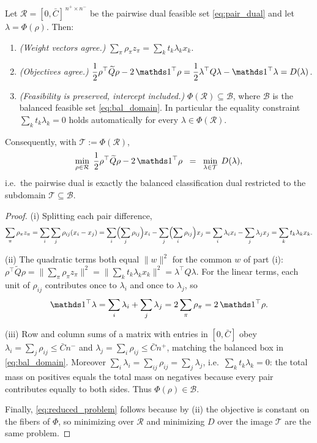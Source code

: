 \begin{theorem}
\label{thm:equivalence}
Let $\mathcal{R} = [0, \bar{C}]^{\,n^+ \times n^-}$ be the pairwise dual
feasible set \eqref{eq:pair_dual} and let $\lambda = \Phi(\rho)$. Then:
\begin{enumerate}
\item[(i)] \emph{(Weight vectors agree.)}
$\displaystyle \sum_\pi \rho_\pi z_\pi = \sum_k t_k \lambda_k x_k$.
\item[(ii)] \emph{(Objectives agree.)}
$\displaystyle \frac{1}{2}\rho^\top \widetilde{Q} \rho - 2\,\mathbbm{1}^\top\rho
= \frac{1}{2}\lambda^\top Q \lambda - \mathbbm{1}^\top\lambda = D(\lambda)$.
\item[(iii)] \emph{(Feasibility is preserved, intercept included.)}
$\Phi(\mathcal{R}) \subseteq \mathcal{B}$, where $\mathcal{B}$ is the
balanced feasible set \eqref{eq:bal_domain}. In particular the equality
constraint $\sum_k t_k \lambda_k = 0$ holds automatically for every
$\lambda \in \Phi(\mathcal{R})$.
\end{enumerate}
Consequently, with $\mathcal{T} := \Phi(\mathcal{R})$,
\begin{equation}
\min_{\rho \in \mathcal{R}}\;
\frac{1}{2}\rho^\top \widetilde{Q} \rho - 2\,\mathbbm{1}^\top\rho
\;\;=\;\;
\min_{\lambda \in \mathcal{T}}\; D(\lambda),
\label{eq:reduced_problem}
\end{equation}
i.e.\ the pairwise dual is exactly the balanced classification dual restricted
to the subdomain $\mathcal{T} \subseteq \mathcal{B}$.
\end{theorem}

\begin{proof}
(i) Splitting each pair difference,
\[
\sum_\pi \rho_\pi z_\pi
= \sum_{i}\sum_{j} \rho_{ij}(x_i - x_j)
= \sum_i \Bigl(\sum_j \rho_{ij}\Bigr) x_i - \sum_j \Bigl(\sum_i \rho_{ij}\Bigr) x_j
= \sum_i \lambda_i x_i - \sum_j \lambda_j x_j
= \sum_k t_k \lambda_k x_k .
\]

(ii) The quadratic terms both equal $\|w\|^2$ for the common $w$ of part (i):
$\rho^\top \widetilde{Q}\rho = \|\sum_\pi \rho_\pi z_\pi\|^2 =
\|\sum_k t_k\lambda_k x_k\|^2 = \lambda^\top Q \lambda$. For the linear terms,
each unit of $\rho_{ij}$ contributes once to $\lambda_i$ and once to
$\lambda_j$, so
\[
\mathbbm{1}^\top \lambda
= \sum_i \lambda_i + \sum_j \lambda_j
= 2 \sum_\pi \rho_\pi
= 2\,\mathbbm{1}^\top \rho .
\]

(iii) Row and column sums of a matrix with entries in $[0, \bar{C}]$ obey
$\lambda_i = \sum_j \rho_{ij} \le \bar{C} n^-$ and
$\lambda_j = \sum_i \rho_{ij} \le \bar{C} n^+$, matching the balanced box in
\eqref{eq:bal_domain}. Moreover $\sum_i \lambda_i = \sum_{ij} \rho_{ij} =
\sum_j \lambda_j$, i.e.\ $\sum_k t_k \lambda_k = 0$: the total mass on
positives equals the total mass on negatives because every pair contributes
equally to both sides. Thus $\Phi(\rho) \in \mathcal{B}$.

Finally, \eqref{eq:reduced_problem} follows because by (ii) the objective is
constant on the fibers of $\Phi$, so minimizing over $\mathcal{R}$ and
minimizing $D$ over the image $\mathcal{T}$ are the same problem.
\end{proof}


